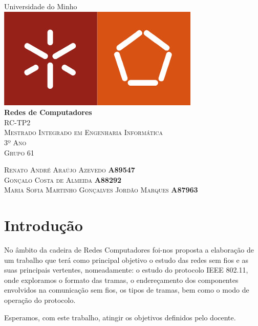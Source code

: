 \documentclass{article}
\begin{document}
\begin{capa}
	\begin{center}
	\vspace*{1.0cm}
	\huge{Universidade do Minho}\\
	[1.0cm]
	\includegraphics{logo.jpg}\\
	[1.5cm]
	\huge{\textbf{Redes de Computadores}}\\
	[0.5cm]
	\textsc{RC-TP2}\\
	\textsc{\normalsize{Mestrado Integrado em Engenharia Informática}}\\
	\textsc{\normalsize{3º Ano}}\\
	\textsc{\normalsize{Grupo 61}}\\
	[12.0cm]
	\end{center}
	\begin{flushleft}
	\textsc{Renato André Araújo Azevedo \textbf{\hspace*{130pt} A89547}}\\
	\textsc{Gonçalo Costa de Almeida \textbf{\hspace*{151pt} A88292}}\\
	\textsc{Maria Sofia Martinho Gonçalves Jordão Marques \textbf{\hspace*{30pt} A87963}}\\
	\end{flushleft}
\end{capa}

\newpage
\tableofcontents
\newpage

\section{Introdução}
	No âmbito da cadeira de Redes Computadores foi-nos proposta a elaboração de um trabalho
	que terá como principal objetivo  o estudo das redes sem fios e as suas principais vertentes,
	nomeadamente: o estudo do protocolo IEEE 802.11, onde exploramos o formato das tramas,
	o endereçamento dos componentes envolvidos na comunicação sem fios,
	os tipos de tramas, bem como o modo de operação do protocolo.\par
	Esperamos, com este trabalho, atingir os objetivos definidos pelo docente. \\
\end{document}
